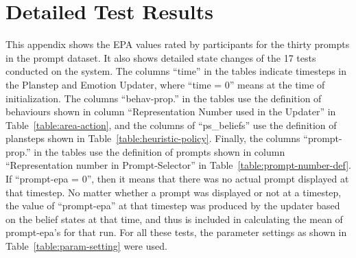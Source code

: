 
\chapter{Detailed Test Results}
\label{chap:appendix}

This appendix shows the EPA values rated by participants for the thirty prompts in the prompt dataset. It also shows detailed state changes of the 17 tests conducted on the system. The columns ``time'' in the tables indicate timesteps in the Planstep and Emotion Updater, where ``time = 0'' means at the time of initialization. The columns ``behav-prop.'' in the tables use the definition of behaviours shown in column ``Representation Number used in the Updater'' in Table~\ref{table:area-action}, and the columns of ``ps\_beliefs'' use the definition of plansteps shown in Table~\ref{table:heuristic-policy}. Finally, the columns ``prompt-prop.'' in the tables use the definition of prompts shown in column ``Representation number in Prompt-Selector'' in Table~\ref{table:prompt-number-def}. If ``prompt-epa = 0'', then it means that there was no actual prompt displayed at that timestep. No matter whether a prompt was displayed or not at a timestep, the value of ``prompt-epa'' at that timestep was produced by the updater based on the belief states at that time, and thus is included in calculating the mean of prompt-epa's for that run. For all these tests, the parameter settings as shown in Table~\ref{table:param-setting} were used.


